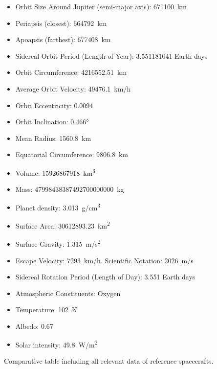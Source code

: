 \begin{itemize}
\item{Orbit Size Around Jupiter (semi-major axis):} \SI{671100}{km}
\item{Periapsis (closest):} \SI{664792}{km}
\item{Apoapsis (farthest):} \SI{677408}{km}
\item{Sidereal Orbit Period (Length of Year):} 3.551181041 Earth days
\item{Orbit Circumference:} \SI{4216552.51}{km}
\item{Average Orbit Velocity:} \SI{49476.1}{km/h}
\item{Orbit Eccentricity:} 0.0094
\item{Orbit Inclination:} \ang{0.466}
\item{Mean Radius:} \SI{1560.8}{km}
\item{Equatorial Circumference:} \SI{9806.8}{km}
\item{Volume:} \SI{15926867918}{km^3}
\item{Mass:} \SI{47998438387492700000000}{kg}
\item{Planet density:} \SI{3.013}{g/cm^3}
\item{Surface Area:} \SI{30612893.23}{km^2}
\item{Surface Gravity:} \SI{1.315}{m/s^2}
\item{Escape Velocity:} \SI{7293}{km/h}. Scientific Notation: \SI{2026}{m/s}
\item{Sidereal Rotation Period (Length of Day):} 3.551 Earth days
\item{Atmospheric Constituents:} Oxygen
\item{Temperature:} \SI{102}{K}
\item{Albedo:} 0.67
\item{Solar intensity:} \SI{49.8}{W/m^2}
\end{itemize}



Comparative table including all relevant data of reference
spacecrafts.

